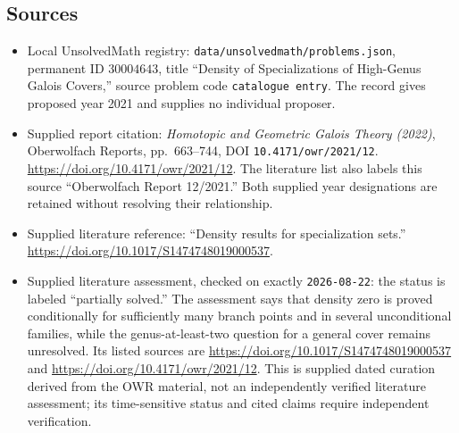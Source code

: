 \documentclass[11pt]{article}
\begin{document}
\subsection{Sources}
\begin{itemize}
\item Local UnsolvedMath registry: \texttt{data/unsolvedmath/problems.json}, permanent ID \(30004643\), title ``Density of Specializations of High-Genus Galois Covers,'' source problem code \texttt{catalogue entry}. The record gives proposed year 2021 and supplies no individual proposer.
\item Supplied report citation: \emph{Homotopic and Geometric Galois Theory (2022)}, Oberwolfach Reports, pp.\ 663--744, DOI \texttt{10.4171/owr/2021/12}. \url{https://doi.org/10.4171/owr/2021/12}. The literature list also labels this source ``Oberwolfach Report 12/2021.'' Both supplied year designations are retained without resolving their relationship.
\item Supplied literature reference: ``Density results for specialization sets.'' \url{https://doi.org/10.1017/S1474748019000537}.
\item Supplied literature assessment, checked on exactly \texttt{2026-08-22}: the status is labeled ``partially solved.'' The assessment says that density zero is proved conditionally for sufficiently many branch points and in several unconditional families, while the genus-at-least-two question for a general cover remains unresolved. Its listed sources are \url{https://doi.org/10.1017/S1474748019000537} and \url{https://doi.org/10.4171/owr/2021/12}. This is supplied dated curation derived from the OWR material, not an independently verified literature assessment; its time-sensitive status and cited claims require independent verification.
\end{itemize}
\end{document}
